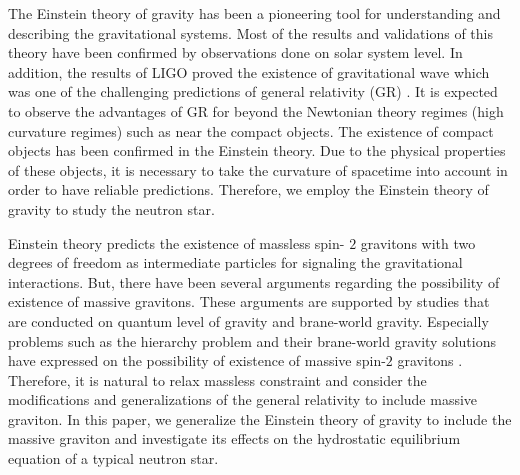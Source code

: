 \documentclass[aps]{revtex4}
\begin{document}
The Einstein theory of gravity has been a pioneering tool for
understanding and describing the gravitational systems. Most of
the results and validations of this theory have been confirmed by
observations done on solar system level. In addition, the results
of LIGO proved the existence of gravitational wave which was one
of the challenging predictions of general relativity (GR)
\cite{LIGO}. It is expected to observe the advantages of GR for
beyond the Newtonian theory regimes (high curvature regimes) such
as near the compact objects. The existence of compact objects has
been confirmed in the Einstein theory. Due to the physical
properties of these objects, it is necessary to take the curvature
of spacetime into account in order to have reliable predictions.
Therefore, we employ the Einstein theory of gravity to study the
neutron star.

Einstein theory predicts the existence of massless spin-%
$2$ gravitons with two degrees of freedom as intermediate particles for
signaling the gravitational interactions. But, there have been several
arguments regarding the possibility of existence of massive gravitons. These
arguments are supported by studies that are conducted on quantum level of
gravity and brane-world gravity. Especially problems such as the hierarchy
problem and their brane-world gravity solutions have expressed on the
possibility of existence of massive spin-$2$ gravitons \cite%
{DvaliGP,DvaliGPI}. Therefore, it is natural to relax massless constraint
and consider the modifications and generalizations of the general relativity
to include massive graviton. In this paper, we generalize the Einstein
theory of gravity to include the massive graviton and investigate its
effects on the hydrostatic equilibrium equation of a typical neutron star.
\end{document}
